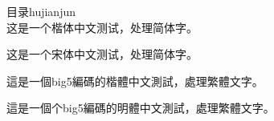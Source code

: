 \documentclass{article}
\begin{document}
\begin{CJK}{UTF8}{gkai}

  \renewcommand{\contentsname}{目录}
  \renewcommand{\listfigurename}{插图目录}
  \renewcommand{\listtablename}{表格目录}
  \renewcommand{\refname}{参考文献}
  \renewcommand{\abstractname}{摘要}
  \renewcommand{\indexname}{索引}
  \renewcommand{\tablename}{表}
  \renewcommand{\figurename}{图}

  \contentsname{hujianjun}\\
  这是一个楷体中文测试，处理简体字。\\
\end{CJK}

\begin{CJK}{UTF8}{gbsn}
这是一个宋体中文测试，处理简体字。\\
\end{CJK}

\begin{CJK}{UTF8}{bkai}
這是一個big5編碼的楷體中文測試，處理繁體文字。\\
\end{CJK}

\begin{CJK}{UTF8}{bsmi}
這是一個个big5編碼的明體中文測試，處理繁體文字。\\
\end{CJK}
\end{document}
